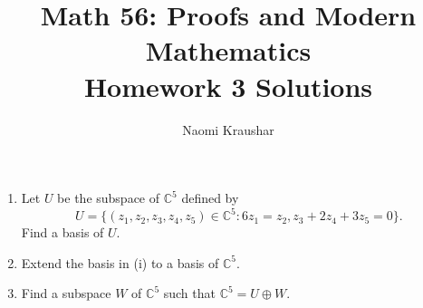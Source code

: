 \documentclass[12pt]{article}
\theoremstyle{definition}
\theoremstyle{definition}
\newcommand{\C}{\mathbb{C}}
\begin{document}
\title{Math 56: Proofs and Modern Mathematics\\ Homework 3 Solutions}
\author{Naomi Kraushar}
\maketitle



\begin{prob}[Axler 2.B.4]
\begin{enumerate}[label=(\roman*)]
\item Let $U$ be the subspace of $\C^5$ defined by
\[U=\{(z_1, z_2, z_3, z_4, z_5)\in\C^5: 6z_1=z_2, z_3+ 2z_4+ 3z_5= 0\}.\]
Find a basis of $U$.

\item Extend the basis in (i) to a basis of $\C^5$.

\item Find a subspace $W$ of $\C^5$ such that $\C^5=U\oplus W$.
\end{enumerate}
\end{prob}
\end{document}
